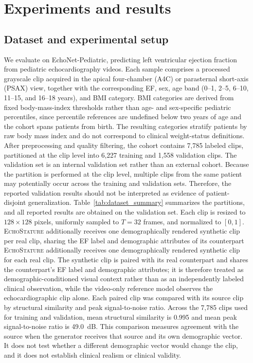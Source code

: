 \documentclass{ws-procs11x85}
\begin{document}
\section{Experiments and results}

\subsection{Dataset and experimental setup}

We evaluate on EchoNet-Pediatric, predicting left ventricular ejection fraction from pediatric echocardiography videos.\cite{reddy2023echonetpeds}
Each sample comprises a processed grayscale clip acquired in the apical four-chamber (A4C) or parasternal short-axis (PSAX) view, together with the corresponding EF, sex, age band (0--1, 2--5, 6--10, 11--15, and 16--18 years), and BMI category.
BMI categories are derived from fixed body-mass-index thresholds rather than age- and sex-specific pediatric percentiles, since percentile references are undefined below two years of age and the cohort spans patients from birth.
The resulting categories stratify patients by raw body mass index and do not correspond to clinical weight-status definitions.
{\color{red}After preprocessing and quality filtering, the cohort contains 7,785
labeled clips, partitioned at the clip level into 6,227 training and 1,558
validation clips. The validation set is an internal validation set rather
than an external cohort. Because the partition is performed at the clip
level, multiple clips from the same patient may potentially occur across
the training and validation sets. Therefore, the reported validation
results should not be interpreted as evidence of patient-disjoint
generalization.}
Table~\ref{tab:dataset_summary} summarizes the partitions, and all reported results are obtained on the validation set.
Each clip is resized to $128 \times 128$ pixels, uniformly sampled to $T=32$ frames, and normalized to $[0,1]$.
{\color{blue}\textsc{EchoStature} additionally receives one demographically rendered synthetic clip per real clip, sharing the EF label and demographic attributes of its counterpart} {\color{red}\textsc{EchoStature} additionally receives one demographically rendered synthetic
clip for each real clip. The synthetic clip is paired with its real
counterpart and shares the counterpart's EF label and demographic
attributes; it is therefore treated as demographic-conditioned visual
context rather than as an independently labeled clinical observation}, while the video-only reference model observes the echocardiographic clip alone. {\color{red}Each paired clip was compared with its source clip by structural similarity and peak signal-to-noise ratio. Across the 7,785 clips used for training and validation, mean structural similarity is 0.995 and mean peak signal-to-noise ratio is 49.0~dB. This comparison measures agreement with the source when the generator receives that source and its own demographic vector. It does not test whether a different demographic vector would change the clip, and it does not establish clinical realism or clinical validity.}
\end{document}
